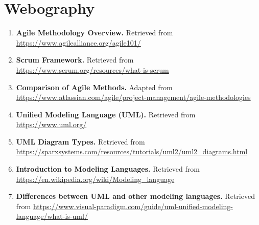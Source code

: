 \section*{Webography}

\begin{enumerate}
    \item \textbf{Agile Methodology Overview.} Retrieved from \url{https://www.agilealliance.org/agile101/}
    \item \textbf{Scrum Framework.} Retrieved from \url{https://www.scrum.org/resources/what-is-scrum}
    \item \textbf{Comparison of Agile Methods.} Adapted from \url{https://www.atlassian.com/agile/project-management/agile-methodologies}
    \item \textbf{Unified Modeling Language (UML).} Retrieved from \url{https://www.uml.org/}
    \item \textbf{UML Diagram Types.} Retrieved from \url{https://sparxsystems.com/resources/tutorials/uml2/uml2_diagrams.html}
    \item \textbf{Introduction to Modeling Languages.} Retrieved from \url{https://en.wikipedia.org/wiki/Modeling_language}
    \item \textbf{Differences between UML and other modeling languages.} Retrieved from \url{https://www.visual-paradigm.com/guide/uml-unified-modeling-language/what-is-uml/}
\end{enumerate}
